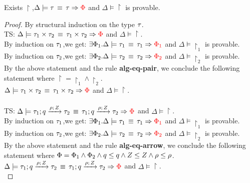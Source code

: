 \begin{lem}
\label{sound-alg-type-eq}
  Exists $\restriction$,$ \Delta \models \tau \, \equiv \, \tau \Rightarrow \textcolor{red} {\Phi}$ and $ \Delta  \models \restriction$ is provable.
\end{lem}
\begin{proof}
By structural induction on the type $\tau$.\\
TS:  $ \Delta \models \tau_1 \times \tau_2 \, \equiv \, \tau_1 \times \tau_2 \Rightarrow \textcolor{red} {\Phi}$ and $ \Delta  \models \restriction$.\\
By induction on $\tau_1$,we get: $\exists \Phi_1. \Delta \models \tau_1 \, \equiv \, \tau_1 \Rightarrow \textcolor{red} {\Phi_1}$ and $ \Delta  \models \restriction_1$ is provable. \\
By induction on $\tau_2$,we get: $\exists \Phi_2. \Delta \models \tau_2 \, \equiv \, \tau_2 \Rightarrow \textcolor{red} {\Phi_2}$ and $ \Delta  \models \restriction_2$ is provable.\\
By the above statement and the rule \textbf{alg-eq-pair}, we conclude the following statement where $ \restriction = \restriction_1 \land \restriction_2 $.\\

$ \Delta \models \tau_1 \times \tau_2 \, \equiv \, \tau_1 \times \tau_2 \Rightarrow \textcolor{red} {\Phi}$ and $ \Delta  \models \restriction$.\\

 \\ 
TS:  $ \Delta \models \tau_1; q \xrightarrow{\rho; \, Z} \tau_2 \, \equiv \, \tau_1; q \xrightarrow{\rho; \, Z} \tau_2 \Rightarrow \textcolor{red} {\Phi}$ and $ \Delta  \models \restriction$.\\
By induction on $\tau_1$,we get: $\exists \Phi_1. \Delta \models \tau_1 \, \equiv \, \tau_1 \Rightarrow \textcolor{red} {\Phi_1}$ and $ \Delta  \models \restriction_1$ is provable. \\
By induction on $\tau_2$,we get: $\exists \Phi_2. \Delta \models \tau_2 \, \equiv \, \tau_2 \Rightarrow \textcolor{red} {\Phi_2}$ and $ \Delta  \models \restriction_2$ is provable.\\
By the above statement and the rule \textbf{alg-eq-arrow}, we conclude the following statement where $ \Phi = \Phi_1 \land \Phi_2 \land q \leq q
    \land Z \leq Z \land \rho \leq \rho $.\\
 $ \Delta \models \tau_1; q \xrightarrow{\rho; \, Z} \tau_2 \, \equiv \, \tau_1; q \xrightarrow{\rho; \, Z} \tau_2 \Rightarrow \textcolor{red} {\Phi}$ and $ \Delta  \models \restriction$.\\
  

\end{proof}
